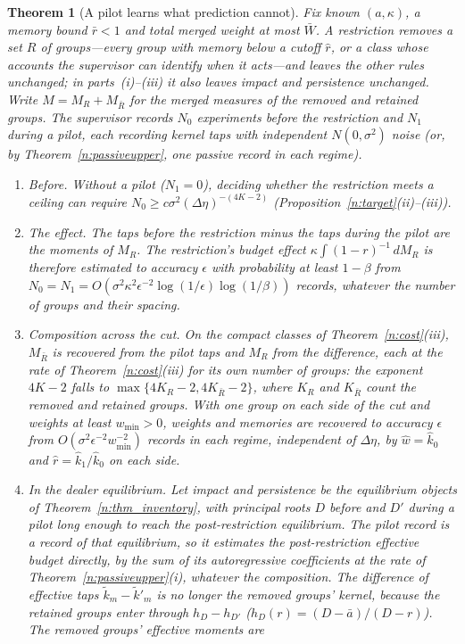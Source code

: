 \documentclass[11pt,letterpaper]{article}
\newtheorem{theorem}{Theorem}[section]
\theoremstyle{definition}
\begin{document}
\begin{theorem}[A pilot learns what prediction cannot]\label{n:pilot}
Fix known $(a, \kappa)$, a memory bound $\bar r < 1$ and total merged weight at most $\bar W$. A restriction removes a set $R$ of groups---every group with memory below a cutoff $\hat r$, or a class whose accounts the supervisor can identify when it acts---and leaves the other rules unchanged; in parts~(i)--(iii) it also leaves impact and persistence unchanged. Write $M = M_R + M_{\bar R}$ for the merged measures of the removed and retained groups. The supervisor records $N_0$ experiments before the restriction and $N_1$ during a pilot, each recording kernel taps with independent $N(0, \sigma^2)$ noise (or, by Theorem~\ref{n:passiveupper}, one passive record in each regime).
\begin{enumerate}
  \item[(i)] \emph{Before.} Without a pilot ($N_1 = 0$), deciding whether the restriction meets a ceiling can require $N_0 \ge c \sigma^2 (\Delta\eta)^{-(4K-2)}$ (Proposition~\ref{n:target}(ii)--(iii)).
  \item[(ii)] \emph{The effect.} The taps before the restriction minus the taps during the pilot are the moments of $M_R$. The restriction's budget effect $\kappa \int (1 - r)^{-1}\, dM_R$ is therefore estimated to accuracy $\epsilon$ with probability at least $1 - \beta$ from $N_0 = N_1 = O(\sigma^2 \kappa^2 \epsilon^{-2} \log(1/\epsilon) \log(1/\beta))$ records, whatever the number of groups and their spacing.
  \item[(iii)] \emph{Composition across the cut.} On the compact classes of Theorem~\ref{n:cost}(iii), $M_{\bar R}$ is recovered from the pilot taps and $M_R$ from the difference, each at the rate of Theorem~\ref{n:cost}(iii) for its own number of groups: the exponent $4K - 2$ falls to $\max\{4K_R - 2, 4K_{\bar R} - 2\}$, where $K_R$ and $K_{\bar R}$ count the removed and retained groups. With one group on each side of the cut and weights at least $w_{\min} > 0$, weights and memories are recovered to accuracy $\epsilon$ from $O(\sigma^2 \epsilon^{-2} w_{\min}^{-2})$ records in each regime, independent of $\Delta\eta$, by $\hat w = \hat k_0$ and $\hat r = \hat k_1 / \hat k_0$ on each side.
  \item[(iv)] \emph{In the dealer equilibrium.} Let impact and persistence be the equilibrium objects of Theorem~\ref{n:thm_inventory}, with principal roots $D$ before and $D'$ during a pilot long enough to reach the post-restriction equilibrium. The pilot record is a record of that equilibrium, so it estimates the post-restriction effective budget directly, by the sum of its autoregressive coefficients at the rate of Theorem~\ref{n:passiveupper}(i), whatever the composition. The difference of effective taps $\tilde k_m - \tilde k'_m$ is no longer the removed groups' kernel, because the retained groups enter through $h_D - h_{D'}$ ($h_D(r) = (D - \bar a)/(D - r)$). The removed groups' effective moments are

\end{enumerate}
\end{theorem}
\end{document}
